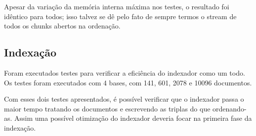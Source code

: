 \documentclass[11pt]{article}
\begin{document}
%

Apesar da variação da memória interna máxima nos testes, o resultado foi idêntico para todos; isso talvez se dê pelo fato de sempre termos o stream de todos os chunks abertos na ordenação.

\subsection{Indexação}

Foram executados testes para verificar a eficiência do indexador como um todo. Os testes foram executados com 4 bases, com 141, 601, 2078 e 10096 documentos.


Com esses dois testes apresentados, é possível verificar que o indexador passa o maior tempo tratando os documentos e escrevendo as triplas do que ordenando-as. Assim uma possível otimização do indexador deveria focar na primeira fase da indexação.
\end{document}

